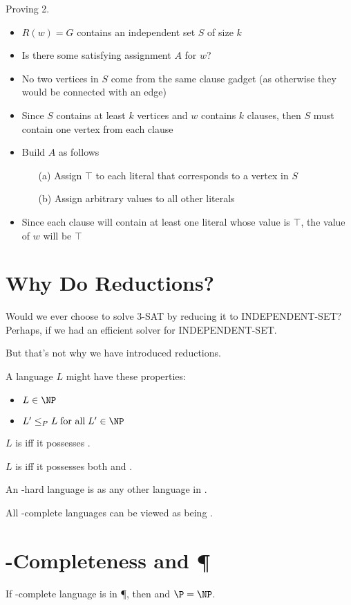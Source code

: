 \documentclass[a4paper]{report}
\newcommand{\bookref}[3]{\marginpar{\faBook{}~#1\\Chapter #2\\Section #3}}
\theoremstyle{definition}
\begin{document}
Proving 2.
\begin{itemize}
\item $R(w) = G$ contains an independent set $S$ of size $k$
\item Is there some satisfying assignment $A$ for $w$?
\item No two vertices in $S$ come from the same clause gadget (as otherwise they would be connected with an edge)
\item Since $S$ contains at least $k$ vertices and $w$ contains $k$ clauses, then $S$ must contain one vertex from each clause
\item Build $A$ as follows
\begin{itemize}
\item[(a)] Assign $\top$ to each literal that corresponds to a vertex in $S$ 
\item[(b)] Assign arbitrary values to all other literals
\end{itemize}
\item Since each clause will contain at least one literal whose value is $\top$, the value of $w$ will be $\top$
\end{itemize}

\section{Why Do Reductions?}
\bookref{ER}{28}{28.5.1}
Would we ever choose to solve 3-SAT by reducing it to INDEPENDENT-SET? Perhaps, if we had an efficient solver for INDEPENDENT-SET.

But that's not why we have introduced reductions.

A language $L$ might have these properties:

\begin{itemize}
\item {} $L \in \NP$
\item {} $L' \leq_{P} L \; \text{for all} \;L' \in \NP$
\end{itemize}

$L$ is  iff it possesses .

$L$ is  iff it possesses both  and .

An \NP-hard language is  as any other language in \NP.

All \NP-complete languages can be viewed as being .

\section{\NP-Completeness and \P}
If  \NP-complete language is  in \P, then  and $\P = \NP$.
\end{document}
